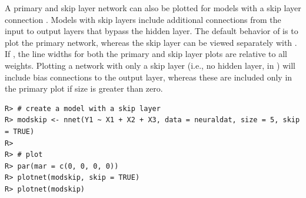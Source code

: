 \documentclass[article,shortnames]{jss}\usepackage[]{graphicx}\usepackage[]{color}
\makeatletter
\newenvironment{kframe}{%
 \def\at@end@of@kframe{}%
 \ifinner\ifhmode%
  \def\at@end@of@kframe{\end{minipage}}%
  \begin{minipage}{\columnwidth}%
 \fi\fi%
 \def\FrameCommand##1{\hskip\@totalleftmargin \hskip-\fboxsep
 \colorbox{shadecolor}{##1}\hskip-\fboxsep
     \hskip-\linewidth \hskip-\@totalleftmargin \hskip\columnwidth}%
 \MakeFramed {\advance\hsize-\width
   \@totalleftmargin\z@ \linewidth\hsize
   \@setminipage}}%
 {\par\unskip\endMakeFramed%
 \at@end@of@kframe}
\newenvironment{knitrout}{}{} %
\makeatother
\begin{document}
A primary and skip layer network can also be plotted for  models with a skip layer connection \citep{Ripley96}. Models with skip layers include additional connections from the input to output layers that bypass the hidden layer.  The default behavior of  is to plot the primary network, whereas the skip layer can be viewed separately with . If , the line widths for both the primary and skip layer plots are relative to all weights. Plotting a network with only a skip layer (i.e., no hidden layer,  in ) will include bias connections to the output layer, whereas these are included only in the primary plot if size is greater than zero.

\begin{knitrout}
\color{fgcolor}\begin{kframe}
\begin{verbatim}
R> # create a model with a skip layer
R> modskip <- nnet(Y1 ~ X1 + X2 + X3, data = neuraldat, size = 5, skip = TRUE)
R> 
R> # plot
R> par(mar = c(0, 0, 0, 0))
R> plotnet(modskip, skip = TRUE)
R> plotnet(modskip)
\end{verbatim}
\end{kframe}\begin{figure}[!ht]

{\centering {}

}
\end{figure}
\end{knitrout}
\end{document}
